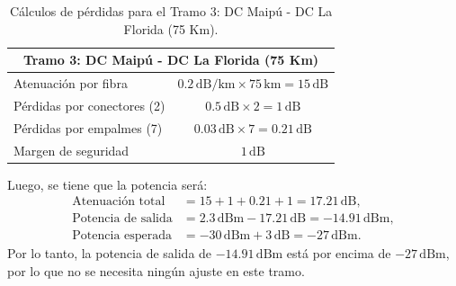 \begin{itemize}
\begin{table}[H]
	\centering
	\renewcommand{\arraystretch}{1.5} %
	\begin{tabular}{|l|c|}
	\hline
	\multicolumn{2}{|c|}{\textbf{Tramo 3: DC Maipú - DC La Florida (75 Km)}} \\ \hline
	Atenuación por fibra            & $0.2 \, \text{dB/km} \times 75 \, \text{km} = 15 \, \text{dB}$ \\ \hline
	Pérdidas por conectores (2)     & $0.5 \, \text{dB} \times 2 = 1 \, \text{dB}$                    \\ \hline
	Pérdidas por empalmes (7)       & $0.03 \, \text{dB} \times 7 = 0.21 \, \text{dB}$                \\ \hline
	Margen de seguridad             & $1 \, \text{dB}$                                               \\ \hline
	\end{tabular}
	\caption{Cálculos de pérdidas para el Tramo 3: DC Maipú - DC La Florida (75 Km).}
	\label{tabla:tramo3}
\end{table}
Luego, se tiene que la potencia será:
\begin{align}
\text{Atenuación total} &= 15 + 1 + 0.21 + 1 = 17.21 \, \text{dB}, \\
\text{Potencia de salida} &= 2.3 \, \text{dBm} - 17.21 \, \text{dB} = -14.91 \, \text{dBm}, \\
\text{Potencia esperada} &= -30 \, \text{dBm} + 3 \, \text{dB} = -27 \, \text{dBm}.
\end{align}
Por lo tanto, la potencia de salida de \(-14.91 \, \text{dBm}\) está por encima de \(-27 \, \text{dBm}\), por lo que no se necesita ningún ajuste en este tramo.


\end{itemize}
